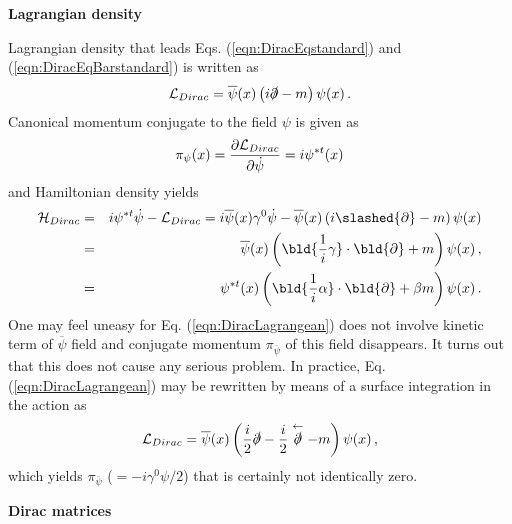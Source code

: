 \bigskip
\noindent
{\bf Lagrangian density}

Lagrangian density that leads Eqs. (\ref{eqn:DiracEqstandard}) and (\ref{eqn:DiracEqBarstandard})
is written as
\begin{eqnarray}
{\cal L}_{Dirac}
=
\overline{\psi}(x)
\left(i \slashed{\partial} - m \right)
\psi(x) \,.
\label{eqn:DiracLagrangean}
\end{eqnarray}
Canonical momentum conjugate to the field $\psi$ is given as
\begin{eqnarray}
\pi_{\psi}(x) = \frac{\partial {\cal L}_{Dirac}}{\partial \dot{\psi}}
=
i \psi^{*t} (x) 
\end{eqnarray}
and Hamiltonian density yields
\begin{eqnarray}
{\cal H}_{Dirac}
&=&
i \psi^{*t}  \dot {\psi} - {\cal L}_{Dirac}
= 
i \overline{\psi}(x) \gamma^0 \dot {\psi}
- 
\overline{\psi}(x)
\left(i \slashed{\partial} - m \right)
\psi(x)
\nonumber\\
&=&
\overline{\psi}(x)
\left(
 \bld{ \frac{1}{i}\gamma}\cdot\bld{\partial} + m 
 \right)
 \psi(x)\,,
 \\
 &=&
\psi^{*t}(x)
\left(
 \bld{ \frac{1}{i}\alpha}\cdot\bld{\partial} + \beta m 
 \right)
 \psi(x)\,.
\end{eqnarray}
One may feel uneasy for Eq. (\ref{eqn:DiracLagrangean})
does not involve kinetic term of $\overline{\psi}$ field and
conjugate momentum $\pi_{\overline{\psi}}$ of this field disappears. It turns out
that this does not cause any serious problem. In practice,
Eq. (\ref{eqn:DiracLagrangean}) may be rewritten by means
of a surface integration in the action as \cite{ref:Itzykson-Zuber}
\begin{eqnarray}
{\cal L}_{Dirac}
=
\overline{\psi}(x)
\left(
\frac{i}{2} \slashed{\partial}
- \frac{i}{2}  \stackrel{\leftarrow}{\slashed{\partial}}
 - m \right)
\psi(x) \,,
\label{eqn:DiracLagrangeanIZ}
\end{eqnarray}
which yields $\pi_{\overline{\psi}}$ ($= -i \gamma^0 \psi / 2$)
that is certainly not identically zero.

\bigskip
\noindent
{\bf Dirac matrices}

